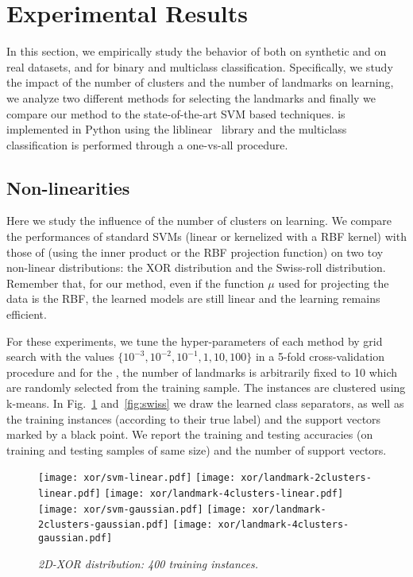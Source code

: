 \section{Experimental Results}
\label{sec:expe}
In this section, we empirically study the behavior of \landSVM both on synthetic and on real datasets, and for binary and multiclass classification. Specifically, we study the impact of the number of clusters and the number of landmarks on learning, we analyze two different methods for selecting the landmarks and finally we compare our method to the state-of-the-art SVM based techniques.
\landSVM is implemented in Python using the liblinear~\cite{REF08a} library and the multiclass classification is performed through a one-vs-all procedure.

\subsection{Non-linearities}
Here we study the influence of the number of clusters on learning. We compare the performances of standard SVMs (linear or kernelized with a RBF kernel) with those of \landSVM (using the inner product or the RBF projection function) on two toy non-linear distributions: the XOR distribution and the Swiss-roll distribution. Remember that, for our method, even if the function $\mu$ used for projecting the data is the RBF, the learned models are still linear and the learning remains efficient.

For these experiments, we tune the hyper-parameters of each method by grid search with the values $\{10^{-3},10^{-2},10^{-1},1,10,100 \}$ in a 5-fold cross-validation procedure and for the \landSVM, the number of landmarks is arbitrarily fixed to 10 which are randomly selected from the training sample. The instances are clustered using k-means. In Fig.~\ref{fig:xor} and~\ref{fig:swiss} we draw the learned class separators, as well as the training instances (according to their true label) and the support vectors marked by a black point. We report the training and testing accuracies (on training and testing samples of same size) and the number of support vectors.

\begin{figure}[h!]
  \centering
    \texttt{[image: xor/svm-linear.pdf]}
    \texttt{[image: xor/landmark-2clusters-linear.pdf]}
    \texttt{[image: xor/landmark-4clusters-linear.pdf]}\\
    \texttt{[image: xor/svm-gaussian.pdf]}    
    \texttt{[image: xor/landmark-2clusters-gaussian.pdf]}
    \texttt{[image: xor/landmark-4clusters-gaussian.pdf]}\\
  \caption{\it{2D-XOR distribution}: 400 training instances.}
  \label{fig:xor}
\end{figure}

